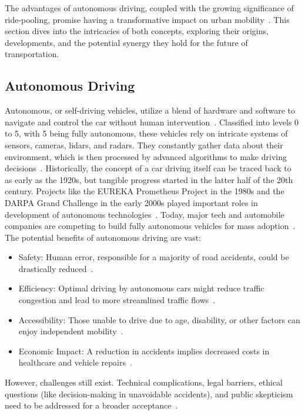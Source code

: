  The advantages of autonomous driving, coupled with the growing significance of ride-pooling, promise having a transformative impact on urban mobility~\cite{Stamadianos.2023}. This section dives into the intricacies of both concepts, exploring their origins, developments, and the potential synergy they hold for the future of transportation.

\subsection{Autonomous Driving}
Autonomous, or self-driving vehicles, utilize a blend of hardware and software to navigate and control the car without human intervention~\cite{Stamadianos.2023}. Classified into levels 0 to 5, with 5 being fully autonomous, these vehicles rely on intricate systems of sensors, cameras, lidars, and radars. They constantly gather data about their environment, which is then processed by advanced algorithms to make driving decisions~\cite{Hacohen.2022}.
Historically, the concept of a car driving itself can be traced back to as early as the 1920s, but tangible progress started in the latter half of the 20th century. Projects like the EUREKA Prometheus Project in the 1980s and the DARPA Grand Challenge in the early 2000s played important roles in development of autonomous technologies~\cite{Hacohen.2022}. Today, major tech and automobile companies are competing to build fully autonomous vehicles for mass adoption~\cite{Stamadianos.2023}.
The potential benefits of autonomous driving are vast:
\begin{itemize}
    \item Safety: Human error, responsible for a majority of road accidents, could be drastically reduced~\cite{Hacohen.2022}.
    \item Efficiency: Optimal driving by autonomous cars might reduce traffic congestion and lead to more streamlined traffic flows~\cite{Stamadianos.2023}.
    \item Accessibility: Those unable to drive due to age, disability, or other factors can enjoy independent mobility~\cite{Hacohen.2022}.
    \item Economic Impact: A reduction in accidents implies decreased costs in healthcare and vehicle repairs~\cite{Stamadianos.2023}.
\end{itemize}

However, challenges still exist. Technical complications, legal barriers, ethical questions (like decision-making in unavoidable accidents), and public skepticism need to be addressed for a broader acceptance~\cite{Hacohen.2022}.

